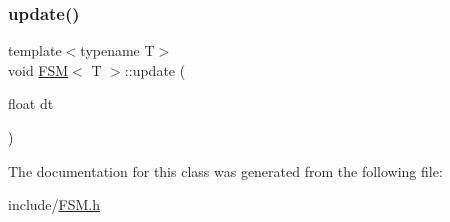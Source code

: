 \mbox{\label{class_f_s_m_aab9a474b025a5e8e813fc2948d229568}} 
\subsubsection{\texorpdfstring{update()}{update()}}
{\footnotesize\ttfamily template$<$typename T$>$ \\
void \hyperlink{class_f_s_m}{F\+SM}$<$ T $>$\+::update (\begin{DoxyParamCaption}\item[{float}]{dt }\end{DoxyParamCaption})\hspace{0.3cm}{\ttfamily [inline]}}



The documentation for this class was generated from the following file\+:\begin{DoxyCompactItemize}
\item 
include/\hyperlink{_f_s_m_8h}{F\+S\+M.\+h}\end{DoxyCompactItemize}
